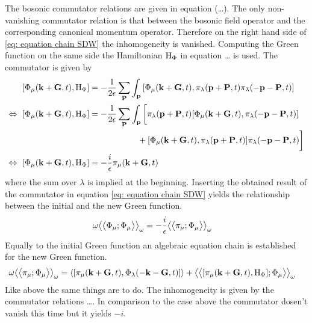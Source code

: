 The bosonic commutator relations are given in equation (\dots{}).
The only non-vanishing commutator relation is that between the bosonic field operator and the corresponding canonical momentum operator.
Therefore on the right hand side of \eqref{eq: equation chain SDW} the inhomogeneity is vanished.
Computing the Green function on the same side the Hamiltonian $\mathrm{H}_{\Phi}$ in equation \dots {} is used.
The commutator is given by
%
\begin{align}
	\comm{\Phi_{\mu}(\vb{k}+\vb{G},t)}{\mt{H}_{\Phi}} &= 
		-\frac{1}{2\epsilon} 
		\sum\limits_{\vb{P}} 
		\int_{\vb{p}}
		\comm{\Phi_{\mu}(\vb{k}+\vb{G},t)}{\pi_{\lambda}(\vb{p}+\vb{P},t) \pi_{\lambda}(-\vb{p}-\vb{P},t)}
	\notag \\
	\Leftrightarrow\ \comm{\Phi_{\mu}(\vb{k}+\vb{G},t)}{\mt{H}_{\Phi}} &= 
		-\frac{1}{2\epsilon} 
		\sum\limits_{\vb{P}} 
		\int_{\vb{p}} \bigg[
			\pi_{\lambda}(\vb{p}+\vb{P},t) \comm{\Phi_{\mu}(\vb{k}+\vb{G},t)}{\pi_{\lambda}(-\vb{p}-\vb{P},t)}
			\notag \\& \hspace{2cm}
			+
			\comm{\Phi_{\mu}(\vb{k}+\vb{G},t)}{\pi_{\lambda}(\vb{p}+\vb{P},t)} \pi_{\lambda}(-\vb{p}-\vb{P},t)
		\bigg]
	\notag \\
	\Leftrightarrow\ \comm{\Phi_{\mu}(\vb{k}+\vb{G},t)}{\mt{H}_{\Phi}} &= 
		-\frac{i}{\epsilon} \pi_{\mu}(\vb{k}+\vb{G},t)
\end{align}
%
where the sum over $\lambda$ is implied at the beginning.
Inserting the obtained result of the commutator in equation \eqref{eq: equation chain SDW} yields the relationship between the initial and the new Green function.
%
\begin{align}
	\omega \big\langle\big\langle{\Phi_{\mu}};{\Phi_{\mu}}\big\rangle\big\rangle_{\omega} &= 
		-\frac{i}{\epsilon} \big\langle\big\langle{\pi_{\mu}};{\Phi_{\mu}}\big\rangle\big\rangle_{\omega}
	\label{eq: first item of the chain}
\end{align}
%
Equally to the initial Green function an algebraic equation chain is established for the new Green function.
%
\begin{align}
	\omega \green{\pi_{\mu}}{\Phi_{\mu}}_{\omega} &= 
		\expval{\comm{\pi_{\mu}(\vb{k}+\vb{G},t)}{\Phi_{\lambda}(-\vb{k}-\vb{G},t)}}
		+
		\green{\comm{\pi_{\mu}(\vb{k}+\vb{G},t)}{\mt{H}_{\Phi}}}{\Phi_{\mu}}_{\omega}
\end{align}
%
Like above the same things are to do.
The inhomogeneity is given by the commutator relations \dots {}.
In comparison to the case above the commutator dosen't vanish this time but it yields $-i$.
